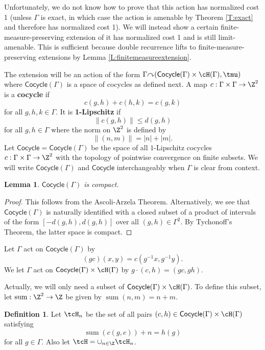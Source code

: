 \documentclass[12pt]{article}
\theoremstyle{plain}
\newtheorem{lem}[thm]{Lemma}
\theoremstyle{definition}
\newtheorem{defn}{Definition}
\theoremstyle{remark}
\newcommand{\G}{\Gamma}
\newcommand\Cocycle{\mathsf{Cocycle}}
\newcommand\ssum{\operatorname{sum}}
\def\cc{{\curvearrowright}}
\begin{document}
Unfortunately, we do not know how to prove that this action has normalized cost 1 (unless $\G$ is exact, in which case the action is amenable by Theorem \ref{T:exact} and therefore has normalized cost 1). We will instead show a certain finite-measure-preserving extension of it has normalized cost 1 and is still limit-amenable. This is sufficient because double recurrence lifts to finite-measure-preserving extensions by Lemma \ref{L:finitemeasureextension}. 

The extension will be an action of the form $\G \cc (\Cocycle (\G)\times \cH(\G), \tmu)$ where $\Cocycle(\G)$ is a space of cocycles as defined next. A map $c:\G\times \G \to \Z^2$ is a {\bf cocycle} if
$$c(g,h)+c(h,k) = c(g,k)$$
for all $g,h,k\in \G$. It is {\bf 1-Lipschitz} if 
$$\|c(g,h)\| \le d(g,h)$$
for all $g,h \in \G$ where the norm on $\Z^2$ is defined by
$$\|(n,m)\|=|n|+|m|.$$
Let $\Cocycle= \Cocycle(\G)$ be the space of all $1$-Lipschitz cocycles $c:\G\times \G \to \Z^2$ with the topology of pointwise convergence on finite subsets. We will write $\Cocycle(\G)$ and $\Cocycle$ interchangeably when $\G$ is clear from context.

\begin{lem}
    $\Cocycle(\G)$ is compact.
\end{lem}
\begin{proof}
This follows from the Ascoli-Arzela Theorem. Alternatively, we see that $\Cocycle(\G)$ is naturally identified with a closed subset of a product of intervals of the form $[-d(g,h),d(g,h)]$ over all $(g,h)\in \G^2$. By Tychonoff's Theorem, the latter space is compact.
\end{proof}
Let $\G$ act on $\Cocycle(\G)$ by
$$(gc)(x,y) = c(g^{-1}x, g^{-1}y).$$
We let $\G$ act on $\Cocycle(\G)\times \cH(\G)$ by $g\cdot (c,h) = (g c, g h)$.

Actually, we will only need a subset of $\Cocycle(\G)\times \cH(\G)$. To define this subset, let $\ssum: \Z^2 \to \Z$ be given by $\ssum(n,m)=n+m$.

\begin{defn}\label{D:extendedhorofunctions}
    Let $\tcH_n$ be the set of all pairs $(c,h) \in \Cocycle(\G)\times \cH(\G)$ satisfying 
$$\ssum(c(g,e))+n=h(g)$$
for all $g\in \G$. Also let $\tcH=\cup_{n \in \Z} \tcH_n$. 
\end{defn}
\end{document}
